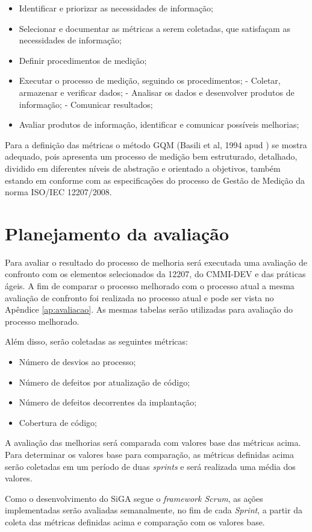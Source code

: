 \begin{itemize}
 \item Identificar e priorizar as necessidades de informação;
 \item Selecionar e documentar as métricas a serem coletadas, que satisfaçam as necessidades de informação;
 \item Definir procedimentos de medição;
 \item Executar o processo de medição, seguindo os procedimentos;
    \subitem - Coletar, armazenar e verificar dados;
    \subitem - Analisar os dados e desenvolver produtos de informação;
    \subitem - Comunicar resultados;
 \item Avaliar produtos de informação, identificar e comunicar possíveis melhorias;
\end{itemize}

Para a definição das métricas o método GQM (Basili et al, 1994 apud \cite{solingen99}) se mostra adequado, 
pois apresenta um processo de medição bem estruturado, detalhado, dividido em diferentes níveis de abstração
e orientado a objetivos, também estando em conforme com as especificações do processo de Gestão de Medição
da norma ISO/IEC 12207/2008.

\section{Planejamento da avaliação}
    
    Para avaliar o resultado do processo de melhoria será executada uma avaliação de confronto com os elementos selecionados
    da 12207, do CMMI-DEV e das práticas ágeis. A fim de comparar o processo melhorado com o processo atual a mesma avaliação 
    de confronto foi realizada no processo atual e pode ser vista no Apêndice \ref{ap:avaliacao}. As mesmas tabelas serão 
    utilizadas para avaliação do processo melhorado.
    
    Além disso, serão coletadas as seguintes métricas:
    
    \begin{itemize}
      \item Número de desvios ao processo;
      \item Número de defeitos por atualização de código;
      \item Número de defeitos decorrentes da implantação;
      \item Cobertura de código;
    \end{itemize}
    
    A avaliação das melhorias será comparada com valores base das métricas acima. Para determinar os valores base para comparação, 
    as métricas definidas acima serão coletadas em um período de duas \textit{sprints} e será realizada uma média dos valores.
    
    Como o desenvolvimento do SiGA segue o \textit{framework Scrum}, as ações implementadas serão avaliadas semanalmente,
    no fim de cada \textit{Sprint}, a partir da coleta das métricas definidas acima e comparação com os valores base.

